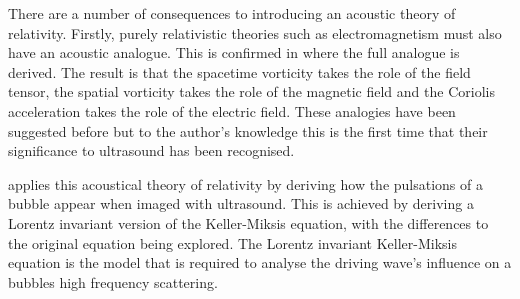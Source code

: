 There are a number of consequences to introducing an acoustic theory of relativity.
Firstly, purely relativistic theories such as electromagnetism must also have an acoustic analogue.
This is confirmed in  where the full analogue is derived.
The result is that the spacetime vorticity takes the role of the field tensor,
the spatial vorticity takes the role of the magnetic field and the Coriolis acceleration takes the role of the electric field.
These analogies have been suggested before\cite{Marmanis2000,Sridhar1998,Garrido1982} but 
to the author's knowledge this is the first time that their significance to ultrasound has been recognised.

 applies this acoustical theory of relativity by deriving how the pulsations of a bubble appear when imaged with ultrasound.
This is achieved by deriving a  Lorentz invariant version of the Keller-Miksis equation,
with the 
differences to the original equation being explored.
The Lorentz invariant Keller-Miksis equation is the model that is required 
to analyse the driving wave's influence on a bubbles high frequency scattering.

